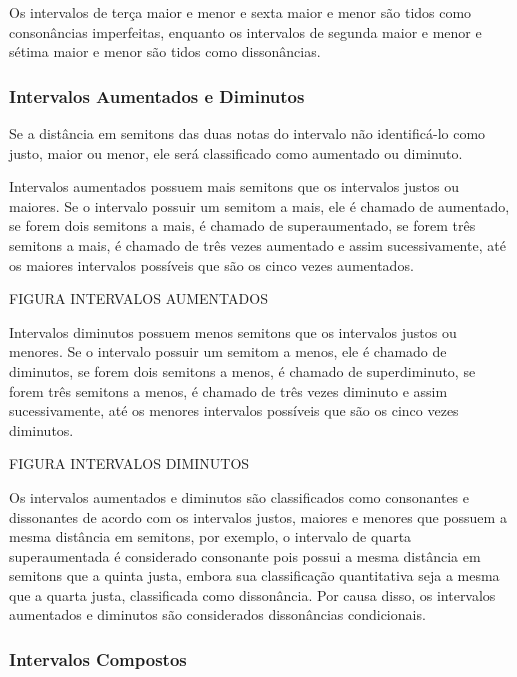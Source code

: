         Os intervalos de terça maior e menor e sexta maior e menor são tidos como consonâncias imperfeitas, enquanto os intervalos de segunda maior e menor e sétima maior e menor são tidos como dissonâncias.

      \subsubsection[Intervalos Aumentados e Diminutos]{Intervalos Aumentados e Diminutos}

        Se a distância em semitons das duas notas do intervalo não identificá-lo como justo, maior ou menor, ele será classificado como aumentado ou diminuto.

        Intervalos aumentados possuem mais semitons que os intervalos justos ou maiores. Se o intervalo possuir um semitom a mais, ele é chamado de aumentado, se forem dois semitons a mais, é chamado de superaumentado, se forem três semitons a mais, é chamado de três vezes aumentado e assim sucessivamente, até os maiores intervalos possíveis que são os cinco vezes aumentados.

        FIGURA INTERVALOS AUMENTADOS

        Intervalos diminutos possuem menos semitons que os intervalos justos ou menores. Se o intervalo possuir um semitom a menos, ele é chamado de diminutos, se forem dois semitons a menos, é chamado de superdiminuto, se forem três semitons a menos, é chamado de três vezes diminuto e assim sucessivamente, até os menores intervalos possíveis que são os cinco vezes diminutos.

        FIGURA INTERVALOS DIMINUTOS

        Os intervalos aumentados e diminutos são classificados como consonantes e dissonantes de acordo com os intervalos justos, maiores e menores que possuem a mesma distância em semitons, por exemplo, o intervalo de quarta superaumentada é considerado consonante pois possui a mesma distância em semitons que a quinta justa, embora sua classificação quantitativa seja a mesma que a quarta justa, classificada como dissonância. Por causa disso, os intervalos aumentados e diminutos são considerados dissonâncias condicionais.

      \subsubsection[Intervalos Compostos]{Intervalos Compostos}

